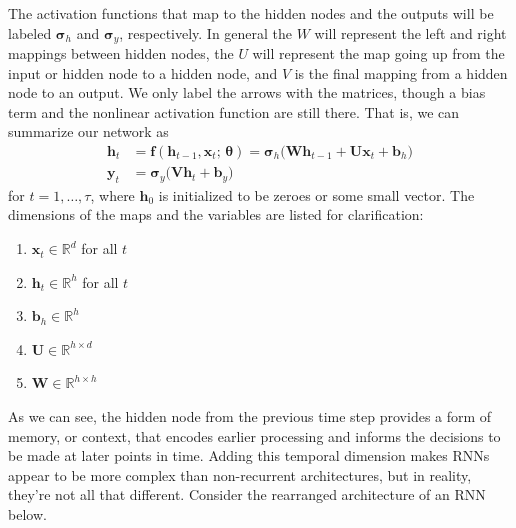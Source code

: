 \documentclass{article}
\begin{document}
  The activation functions that map to the hidden nodes and the outputs will be labeled $\boldsymbol{\sigma}_{h}$ and $\boldsymbol{\sigma}_{y}$, respectively. In general the $W$ will represent the left and right mappings between hidden nodes, the $U$ will represent the map going up from the input or hidden node to a hidden node, and $V$ is the final mapping from a hidden node to an output. We only label the arrows with the matrices, though a bias term and the nonlinear activation function are still there. That is, we can summarize our network as
  \begin{align}
    \mathbf{h}_t & = \mathbf{f}( \mathbf{h}_{t - 1}, \mathbf{x}_{t} ; \, \boldsymbol{\theta}) = \boldsymbol{\sigma}_h \big( \mathbf{W} \mathbf{h}_{t - 1} + \mathbf{U} \mathbf{x}_t + \mathbf{b}_h \big) \\
    \mathbf{y}_t & = \boldsymbol{\sigma}_y \big( \mathbf{V} \mathbf{h}_t + \mathbf{b}_y \big) 
  \end{align}
  for $t = 1, \ldots, \tau$, where $\mathbf{h}_0$ is initialized to be zeroes or some small vector. The dimensions of the maps and the variables are listed for clarification: 
  \begin{enumerate}
    \item $\mathbf{x}_t \in \mathbb{R}^d$ for all $t$
    \item $\mathbf{h}_t \in \mathbb{R}^h$ for all $t$
    \item $\mathbf{b}_h \in \mathbb{R}^h$
    \item $\mathbf{U} \in \mathbb{R}^{h \times d}$
    \item $\mathbf{W} \in \mathbb{R}^{h \times h}$
  \end{enumerate}
  As we can see, the hidden node from the previous time step provides a form of memory, or context, that encodes earlier processing and informs the decisions to be made at later points in time. Adding this temporal dimension makes RNNs appear to be more complex than non-recurrent architectures, but in reality, they’re not all that different. Consider the rearranged architecture of an RNN below. 
\end{document}
